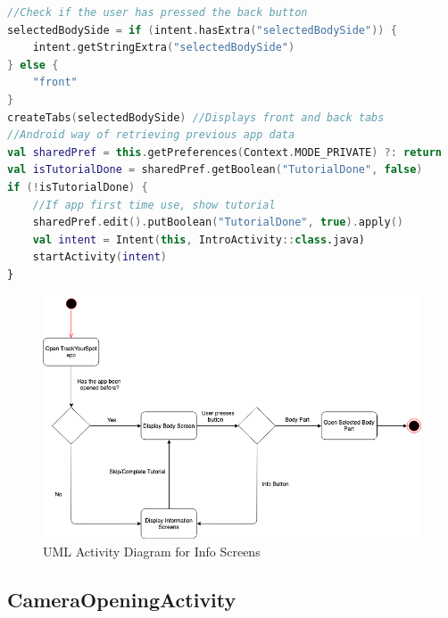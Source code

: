 \begin{lstlisting}[caption={Displaying Information Screens}, label={lst:infoscreens}, language=Kotlin]
//Check if the user has pressed the back button
selectedBodySide = if (intent.hasExtra("selectedBodySide")) {
    intent.getStringExtra("selectedBodySide")
} else {
    "front"
}
createTabs(selectedBodySide) //Displays front and back tabs
//Android way of retrieving previous app data
val sharedPref = this.getPreferences(Context.MODE_PRIVATE) ?: return
val isTutorialDone = sharedPref.getBoolean("TutorialDone", false)
if (!isTutorialDone) {
    //If app first time use, show tutorial
    sharedPref.edit().putBoolean("TutorialDone", true).apply()
    val intent = Intent(this, IntroActivity::class.java)
    startActivity(intent)
}
\end{lstlisting}

\begin{figure}
    \includegraphics[width=1.2\textwidth, center]{figures/InfoDiagram.png}
    \caption{UML Activity Diagram for Info Screens}
    \label{fig:InfoDiagram}
\end{figure}

\subsection{CameraOpeningActivity} \label{sec:cameraarch}

